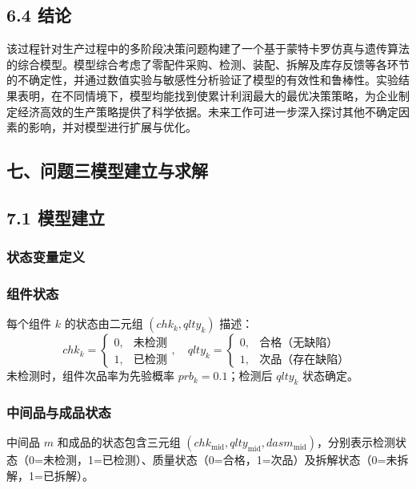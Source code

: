 \documentclass{article}
\begin{document}
	
	
	\subsection*{6.4 结论}
	该过程针对生产过程中的多阶段决策问题构建了一个基于蒙特卡罗仿真与遗传算法的综合模型。模型综合考虑了零配件采购、检测、装配、拆解及库存反馈等各环节的不确定性，并通过数值实验与敏感性分析验证了模型的有效性和鲁棒性。实验结果表明，在不同情境下，模型均能找到使累计利润最大的最优决策策略，为企业制定经济高效的生产策略提供了科学依据。未来工作可进一步深入探讨其他不确定因素的影响，并对模型进行扩展与优化。
	\begin{center}
		\section*{七、问题三模型建立与求解}
	\end{center}	

	
	\subsection*{7.1 模型建立}
	
	\subsubsection*{状态变量定义}
	\subsubsection*{组件状态}
	每个组件 \(k\) 的状态由二元组 \((chk_k, qlty_k)\) 描述：  
	\[
	chk_k = 
	\begin{cases} 
		0, & \text{未检测} \\
		1, & \text{已检测}
	\end{cases}, \quad
	qlty_k = 
	\begin{cases} 
		0, & \text{合格（无缺陷）} \\
		1, & \text{次品（存在缺陷）}
	\end{cases}
	\]  
	未检测时，组件次品率为先验概率 \(prb_k = 0.1\)；检测后 \(qlty_k\) 状态确定。  
	
	\subsubsection*{中间品与成品状态}  
	中间品 \(m\) 和成品的状态包含三元组 \((chk_{\text{mid}}, qlty_{\text{mid}}, dasm_{\text{mid}})\)，分别表示检测状态（0=未检测，1=已检测）、质量状态（0=合格，1=次品）及拆解状态（0=未拆解，1=已拆解）。  
	
\end{document}

